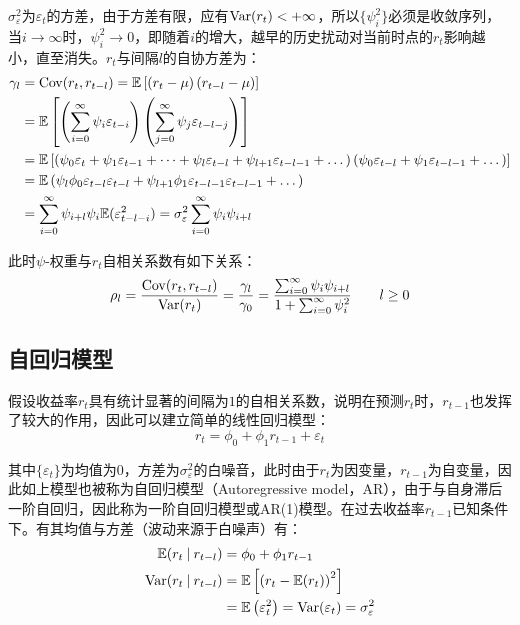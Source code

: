 \documentclass[11pt]{article}
\begin{document}
$\sigma_{\varepsilon}^{2}$为$\varepsilon_t$的方差，由于方差有限，应有$\operatorname{Var}(r_t)<+\infty$，所以$\{\psi_{i}^{2}\}$必须是收敛序列，当$i\rightarrow\infty$时，$\psi_{i}^{2}\rightarrow 0$，即随着$i$的增大，越早的历史扰动对当前时点的$r_t$影响越小，直至消失。$r_t$与间隔$l$的自协方差为：
\begin{align*}
    \gamma_l &= \operatorname{Cov}(r_t,r_{t-l})
    = \mathbb{E}\left[\left(r_t - \mu \right) \left(r_{t-l} - \mu \right) \right] \\
    &= \mathbb{E}\left[\left( \sum_{i=0}^{\infty} \psi_i \varepsilon_{t-i} \right) \left( \sum_{j=0}^{\infty} \psi_j \varepsilon_{t-l-j} \right) \right] \\
    &= \mathbb{E} \left[ \left( \psi_0 \varepsilon_{t} + \psi_1 \varepsilon_{t-1}  + \dots + \psi_l \varepsilon_{t-l} + \psi_{l+1} \varepsilon_{t-l-1}  + \dots \right) \left( \psi_0 \varepsilon_{t-l} + \psi_1 \varepsilon_{t-l-1} + \dots \right) \right] \\
    &= \mathbb{E} \left( \psi_l \phi_0 \varepsilon_{t-l} \varepsilon_{t-l} + \psi_{l+1} \phi_1 \varepsilon_{t-l-1} \varepsilon_{t-l-1}  + \dots \right)\\
    &= \sum_{i=0}^{\infty} \psi_{i+l} \psi_{i} \mathbb{E}(\varepsilon_{t-l-i}^{2}) 
    = \sigma_{\varepsilon}^{2} \sum_{i=0}^{\infty} \psi_i \psi_{i+l} 
\end{align*}

此时$\psi$-权重与$r_t$自相关系数有如下关系：
\begin{equation*}
    \rho_l = \frac{\operatorname{Cov}(r_t,r_{t-l})}{\operatorname{Var}(r_t)}
    = \frac{\gamma_l}{\gamma_0}
    = \frac{\sum_{i=0}^{\infty} \psi_i \psi_{i+l}}{1+ \sum_{i=0}^{\infty} \psi_i^2} \qquad l \geq 0
\end{equation*}

\subsection{自回归模型}

假设收益率$r_t$具有统计显著的间隔为$1$的自相关系数，说明在预测$r_t$时，$r_{t-1}$也发挥了较大的作用，因此可以建立简单的线性回归模型：
\begin{equation*}
    r_t = \phi_0 + \phi_1 r_{t-1} + \varepsilon_t
\end{equation*}

其中$\{\varepsilon_t\}$为均值为0，方差为$\sigma_{\varepsilon}^2$的白噪音，此时由于$r_t$为因变量，$r_{t-1}$为自变量，因此如上模型也被称为自回归模型（Autoregressive model，AR），由于与自身滞后一阶自回归，因此称为一阶自回归模型或AR(1)模型。在过去收益率$r_{t-1}$已知条件下。有其均值与方差（波动来源于白噪声）有：
\begin{align*}
    \mathbb{E}(r_t \:\vert\: r_{t-l}) &= \phi_0 + \phi_1 r_{t-1} \\
    \operatorname{Var}(r_t \:\vert\: r_{t-l}) &= \mathbb{E}\left[\left(r_t - \mathbb{E}(r_t) \right)^2\right] \\
    & = \mathbb{E} \left(\varepsilon_t^2\right) = \operatorname{Var}(\varepsilon_t) = \sigma_{\varepsilon}^{2}
\end{align*}
\end{document}
